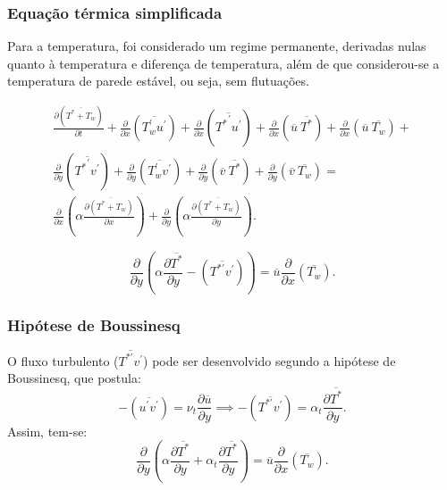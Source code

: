 \documentclass[xcolor=dvipsnames,10pt,aspectratio=169]{beamer}
\begin{document}
		\begin{frame}
		\frametitle{Equação térmica simplificada}
		Para a temperatura, foi considerado um regime permanente, derivadas nulas quanto à temperatura e diferença de temperatura, além de que considerou-se a temperatura de parede estável, ou seja, sem flutuações. 
	 	\begin{center}
	 	\begin{equation*}
	 		\begin{split}
	 		\frac{\partial ( \overline{ T^\ast + T_w } ) }{\partial t}  +
	 		\frac{\partial{}}{\partial{x}} \left(\overline{ T_w^{\prime}  u^{\prime}}\right) +
	 		\frac{\partial{}}{\partial{x}} \left(\overline{{T^{\ast}}^{\prime} u^{\prime}}\right)+ 
	 		 \frac{\partial{}}{\partial{x}}\left(\overline{u} \ \overline{T^{\ast}}\right) + 
	 		\frac{\partial{}}{\partial{x}}\left(\overline{u} \ \overline{T_w}\right)+ 
	 		\\
	 		\frac{\partial{}}{\partial{y}} \left(\overline{{T^{\ast}}^{\prime} v^{\prime}}\right)+
	 		\frac{\partial{}}{\partial{y}} \left(\overline{T_w^\prime  v^\prime}\right) + \frac{\partial{}}{\partial{y}}\left(\overline{v}  \ \overline{T^\ast}\right) +
	 		\frac{\partial{}}{\partial{y}}\left(\overline{v} \ \overline{T_w}\right) 
	 		= 
	 		\\
	 		{\frac{\partial{}}{\partial{x}}} \left(\alpha {\frac{\partial{\overline{(T^\ast + T_w)}}}{\partial{x}}} \right) +
	 		{\frac{\partial{}}{\partial{y}}} \left(\alpha {\frac{\partial{\overline{(T^\ast +  T_w )}}}{\partial{y}}} \right) .
	 		\end{split}
	 	\end{equation*}
 		\end{center}
 		\begin{equation}\label{equation_var}
 			{\frac{\partial{}}{\partial{y}}} \left(\alpha {\frac{\partial{\overline{T^\ast}}}{\partial{y}}}   
 			- \left(\overline{ T^{\ast\prime} v^\prime}\right) \right)
 			= 
 			\overline{u}\frac{\partial{}}{\partial{x}}\left(\overline{T_w}\right)  .
 		\end{equation}
		\end{frame}


		
		\begin{frame}
			\frametitle{Hipótese de Boussinesq}
			O fluxo turbulento ($\overline{T^{\ast\prime}  v^\prime}$) pode ser desenvolvido segundo a hipótese de Boussinesq, que postula:
			\begin{equation}\label{bou}
			-\left(\overline{ u^\prime  v^\prime}\right) = 
			\nu_t \frac{\partial{\overline{u}}}{\partial{y}}
			\implies
			-\left(\overline{ T^{\ast\prime}  v^\prime}\right) = 
			\alpha_t \frac{\partial{\overline{T^\ast}}}{\partial{y}}.
			\end{equation}
			Assim, tem-se: 
			\\
				\begin{equation}
				{\frac{\partial{}}{\partial{y}}} \left(\alpha {\frac{\partial{\overline{T^\ast}}}{\partial{y}}}   
				+ \alpha_t  \frac{\partial \overline{T^\ast}}{\partial y} \right)
				= 
				\overline{u}\frac{\partial{}}{\partial{x}}\left(\overline{T_w}\right) . 
				\end{equation}
		\end{frame}
	
\end{document}

